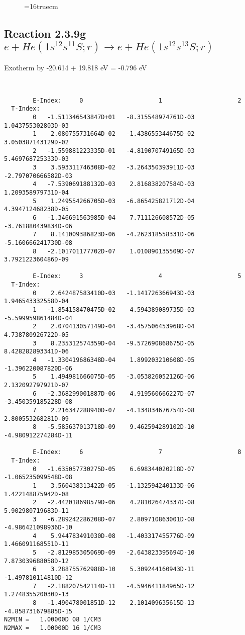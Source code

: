 \documentclass[12pt,dvipdfmx]{article}
\begin{document}
\begin{figure} \label{2.3.9f}
\epsfxsize=16truecm
\end{figure}
\newpage

\subsection{
Reaction 2.3.9g $ e + He(1s^12s^11S;r) \rightarrow e + He(1s^12s^13S;r) $
}
Exotherm by -20.614 + 19.818 eV = -0.796 eV



\begin{small}\begin{verbatim}


        E-Index:     0                     1                     2
  T-Index:
        0   -1.511346543847D+01   -8.315548974761D-03    1.043755302803D-03
        1    2.080755731664D-02   -1.438655344675D-02    3.050387143129D-02
        2   -1.559881223335D-01   -4.819070749165D-03    5.469768725333D-03
        3    3.593311746308D-02   -3.264350393911D-03   -2.797070666582D-03
        4   -7.539069188132D-03    2.816838207584D-03    1.209358979731D-04
        5    1.249554266705D-03   -6.865425821712D-04    4.394712468238D-05
        6   -1.346691563985D-04    7.711126608572D-05   -3.761880439834D-06
        7    8.141009386823D-06   -4.262318558331D-06   -5.160666241730D-08
        8   -2.101701177702D-07    1.010890135509D-07    3.792122360486D-09

        E-Index:     3                     4                     5
  T-Index:
        0    2.642487583410D-03   -1.141726366943D-03    1.946543332558D-04
        1   -1.854158470475D-02    4.594389089735D-03   -5.599959861484D-04
        2    2.070413057149D-04   -3.457506453968D-04    4.738780926722D-05
        3    8.235312574359D-04   -9.572690868675D-05    8.428282893341D-06
        4   -1.330419686348D-04    1.899203210608D-05   -1.396220087820D-06
        5    1.494981666075D-05   -3.053826052126D-06    2.132092797921D-07
        6   -2.368299001887D-06    4.919560666227D-07   -3.450359185228D-08
        7    2.216347288940D-07   -4.134834676754D-08    2.800553268281D-09
        8   -5.585637013718D-09    9.462594289102D-10   -4.980912274284D-11

        E-Index:     6                     7                     8
  T-Index:
        0   -1.635057730275D-05    6.698344020218D-07   -1.065235099548D-08
        1    3.560438313422D-05   -1.132594240133D-06    1.422148875942D-08
        2   -2.442018698579D-06    4.281026474337D-08    5.902980719683D-11
        3   -6.289242286208D-07    2.809710863001D-08   -4.986421098936D-10
        4    5.944783491030D-08   -1.403317455776D-09    1.466091168551D-11
        5   -2.812985305069D-09   -2.643823395694D-10    7.873039688058D-12
        6    3.288755762988D-10    5.309244160943D-11   -1.497810114810D-12
        7   -2.188207542114D-11   -4.594641184965D-12    1.274835520030D-13
        8   -1.490478001851D-12    2.101409635615D-13   -4.858731679885D-15
N2MIN =   1.00000D 08 1/CM3
N2MAX =   1.00000D 16 1/CM3


\end{verbatim}
\end{small}
\end{document}
